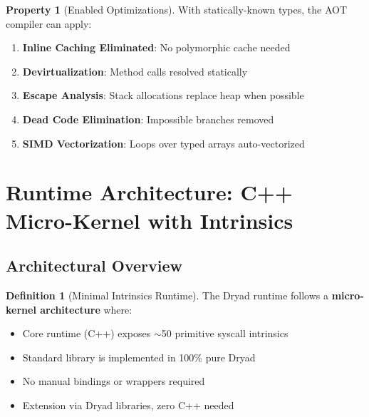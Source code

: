 \documentclass[12pt,a4paper]{article}
\theoremstyle{definition}
\newtheorem{definition}{Definition}[section]
\newtheorem{property}{Property}[section]
\begin{document}
\begin{property}[Enabled Optimizations]
With statically-known types, the AOT compiler can apply:
\begin{enumerate}[leftmargin=*]
    \item \textbf{Inline Caching Eliminated}: No polymorphic cache needed
    \item \textbf{Devirtualization}: Method calls resolved statically
    \item \textbf{Escape Analysis}: Stack allocations replace heap when possible
    \item \textbf{Dead Code Elimination}: Impossible branches removed
    \item \textbf{SIMD Vectorization}: Loops over typed arrays auto-vectorized
\end{enumerate}
\end{property}

\newpage

\section{Runtime Architecture: C++ Micro-Kernel with Intrinsics}

\subsection{Architectural Overview}

\begin{definition}[Minimal Intrinsics Runtime]
The Dryad runtime follows a \textbf{micro-kernel architecture} where:
\begin{itemize}[leftmargin=*]
    \item Core runtime (C++) exposes $\sim$50 primitive syscall intrinsics
    \item Standard library is implemented in 100\% pure Dryad
    \item No manual bindings or wrappers required
    \item Extension via Dryad libraries, zero C++ needed
\end{itemize}
\end{definition}
\end{document}

